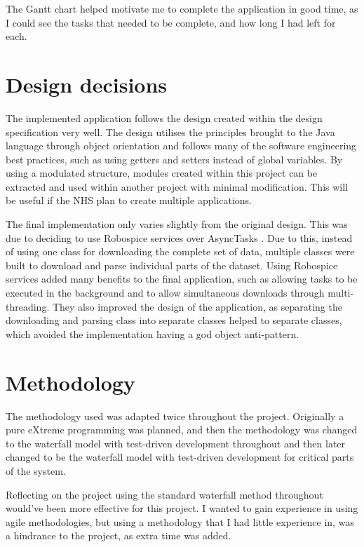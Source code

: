 The Gantt chart helped motivate me to complete the application in good time, as I could see the tasks that needed to be complete, and how long I had left for each.

\section{Design decisions}

The implemented application follows the design created within the design specification very well. The design utilises the principles brought to the Java language \cite{java} through object orientation and follows many of the software engineering best practices, such as using getters and setters instead of global variables. By using a modulated structure, modules created within this project can be extracted and used within another project with minimal modification. This will be useful if the NHS plan to create multiple applications.

The final implementation only varies slightly from the original design. This was due to deciding to use Robospice services \cite{robospice} over AsyncTasks \cite{async_task}. Due to this, instead of using one class for downloading the complete set of data, multiple classes were built to download and parse individual parts of the dataset. Using Robospice services added many benefits to the final application, such as allowing tasks to be executed in the background and to allow simultaneous downloads through multi-threading. They also improved the design of the application, as separating the downloading and parsing class into separate classes helped to separate classes, which avoided the implementation having a god object anti-pattern.


\section{Methodology}

The methodology used was adapted twice throughout the project. Originally a pure eXtreme programming \cite{xp} was planned, and then the methodology was changed to the waterfall model \cite{waterfall} with test-driven development \cite{tdd} throughout and then later changed to be the waterfall model with test-driven development for critical parts of the system.

Reflecting on the project using the standard waterfall \cite{waterfall} method throughout would've been more effective for this project. I wanted to gain experience in using agile methodologies, but using a methodology that I had little experience in, was a hindrance to the project, as extra time was added.

